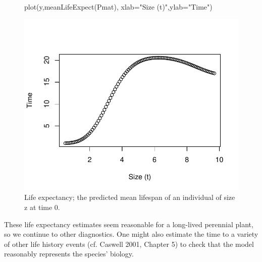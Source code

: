\documentclass[11pt]{article}
\begin{document}
\begin{figure}[H]
\begin{center}
\begin{Schunk}
\begin{Sinput}
   plot(y,meanLifeExpect(Pmat), xlab="Size (t)",ylab="Time")
\end{Sinput}
\end{Schunk}
\includegraphics{IPM_Guide_Appendix_A-fig_life_expect}
\caption{Life expectancy; the predicted mean lifespan of an individual of size z at time 0.}
\label{fig:fig_life_expect}
\end{center}
\end{figure}
    
These life expectancy estimates seem reasonable for a long-lived perennial plant, so we continue to other diagnostics. One might also estimate the time to a variety of other life history events (cf. Caswell 2001, Chapter 5) to check that the model reasonably represents the species' biology.

% 
% 
\end{document}
